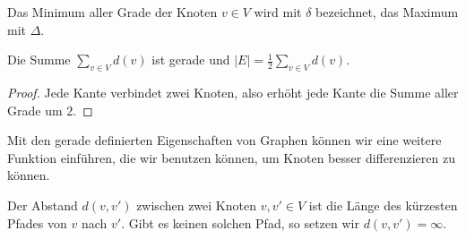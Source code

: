 \begin{df}
Das Minimum aller Grade der Knoten $v \in V$ wird mit $\delta$ bezeichnet, das Maximum mit $\Delta$.
\end{df}

\begin{fakt}
Die Summe $\sum\limits_{v\in V}d(v)$ ist gerade und $|E|  = \frac{1}{2}\sum\limits_{v\in V}d(v)$.
\begin{proof}
Jede Kante verbindet zwei Knoten, also erhöht jede Kante die Summe aller Grade um 2.
\end{proof}
\end{fakt}

Mit den gerade definierten Eigenschaften von Graphen können wir eine weitere Funktion einführen, die wir benutzen können, um Knoten besser differenzieren zu können.

\begin{df}
Der Abstand $d(v,v')$ zwischen zwei Knoten $v,v' \in V$ ist die Länge des kürzesten Pfades von $v$ nach $v'$. Gibt es keinen solchen Pfad, so setzen wir $d(v,v') = \infty$.
\end{df}







